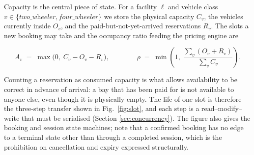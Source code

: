 \documentclass[journal,onecolumn,11pt]{IEEEtran}
\begin{document}
Capacity is the central piece of state. For a facility $\ell$ and vehicle class
$v \in \{\textit{two\_wheeler}, \textit{four\_wheeler}\}$ we store the physical
capacity $C_v$, the vehicles currently inside $O_v$, and the
paid-but-not-yet-arrived reservations $R_v$. The slots a new booking may take
and the occupancy ratio feeding the pricing engine are

\begin{equation}
  A_v \;=\; \max\bigl(0,\; C_v - O_v - R_v\bigr),
  \qquad\qquad
  \rho \;=\; \min\!\left(1,\;
    \frac{\sum_{v}\left(O_v + R_v\right)}{\sum_{v} C_v}\right).
  \label{eq:available}
\end{equation}

Counting a reservation as consumed capacity is what allows availability to be
correct in advance of arrival: a bay that has been paid for is not available to
anyone else, even though it is physically empty. The life of one slot is
therefore the three-step transfer shown in Fig.~\ref{fig:slot}, and each step
is a read--modify--write that must be serialised (Section
\ref{sec:concurrency}). The figure also gives the booking and session state
machines; note that a confirmed booking has no edge to a terminal state other
than through a completed session, which is the prohibition on cancellation and
expiry expressed structurally.
\end{document}
